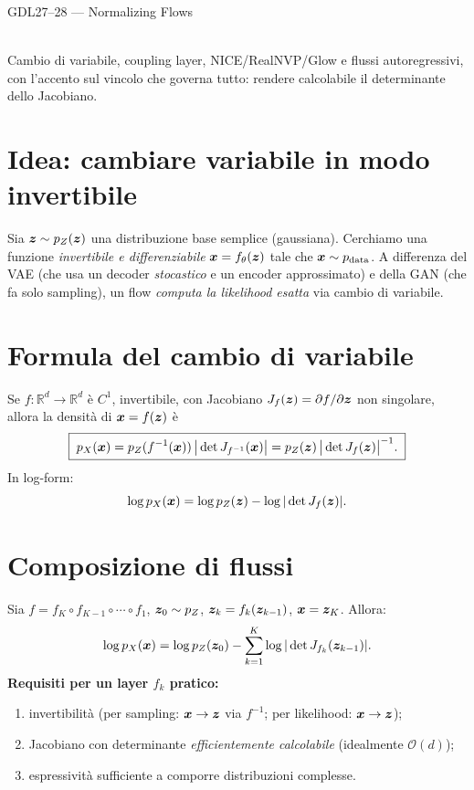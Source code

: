 \begin{risorsevideo}{GDL27--28 — Normalizing Flows}

\medskip
{}\\
Cambio di variabile, coupling layer, NICE/RealNVP/Glow e flussi autoregressivi, con l'accento sul vincolo che governa tutto: rendere calcolabile il determinante dello Jacobiano.
\end{risorsevideo}

\section{Idea: cambiare variabile in modo invertibile}

Sia $\bm{z} \sim p_Z(\bm{z})$ una distribuzione base semplice (gaussiana). Cerchiamo una funzione \emph{invertibile e differenziabile} $\bm{x} = f_\theta(\bm{z})$ tale che $\bm{x} \sim p_{\text{data}}$. A differenza del VAE (che usa un decoder \emph{stocastico} e un encoder approssimato) e della GAN (che fa solo sampling), un flow \emph{computa la likelihood esatta} via cambio di variabile.

\section{Formula del cambio di variabile}

\begin{theorem}
Se $f: \mathbb{R}^d \to \mathbb{R}^d$ è $C^1$, invertibile, con Jacobiano $J_f(\bm{z}) = \partial f/\partial \bm{z}$ non singolare, allora la densità di $\bm{x} = f(\bm{z})$ è
\[
\boxed{\;p_X(\bm{x}) = p_Z(f^{-1}(\bm{x}))\, \big|\det J_{f^{-1}}(\bm{x})\big| = p_Z(\bm{z})\, \big|\det J_f(\bm{z})\big|^{-1}.\;}
\]
In log-form:
\[
\log p_X(\bm{x}) = \log p_Z(\bm{z}) - \log |\det J_f(\bm{z})|.
\]
\end{theorem}

\section{Composizione di flussi}

Sia $f = f_K \circ f_{K-1} \circ \cdots \circ f_1$, $\bm{z}_0 \sim p_Z$, $\bm{z}_k = f_k(\bm{z}_{k-1})$, $\bm{x} = \bm{z}_K$. Allora:
\[
\log p_X(\bm{x}) = \log p_Z(\bm{z}_0) - \sum_{k=1}^K \log |\det J_{f_k}(\bm{z}_{k-1})|.
\]
\textbf{Requisiti per un layer $f_k$ pratico:}
\begin{enumerate}
  \item invertibilità (per sampling: $\bm{x} \to \bm{z}$ via $f^{-1}$; per likelihood: $\bm{x} \to \bm{z}$);
  \item Jacobiano con determinante \emph{efficientemente calcolabile} (idealmente $\mathcal{O}(d)$);
  \item espressività sufficiente a comporre distribuzioni complesse.
\end{enumerate}

